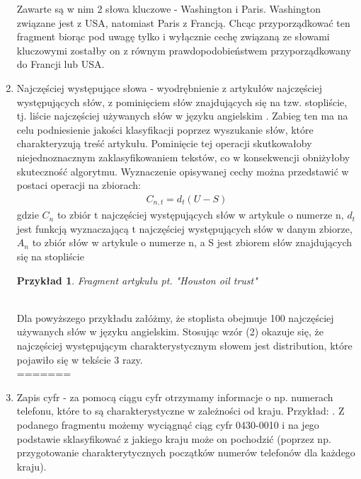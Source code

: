 \documentclass{classrep}
\newtheorem{exmp}{Przykład}[section]
\begin{document}
\begin{enumerate}
    Zawarte są w nim 2 słowa kluczowe - Washington i Paris. Washington związane jest z USA, natomiast Paris z Francją. Chcąc przyporządkować ten fragment biorąc pod uwagę tylko i wyłącznie cechę związaną ze słowami kluczowymi zostałby on z równym prawdopodobieństwem przyporządkowany do Francji lub USA. 
    \item Najczęściej występujące słowa - wyodrębnienie z artykułów najczęściej występujących słów, z pominięciem słów znajdujących się na tzw. stopliście, tj. liście najczęściej używanych słów w języku angielskim \cite{reuters}. Zabieg ten ma na celu podniesienie jakości klasyfikacji poprzez wyszukanie słów, które charakteryzują treść artykułu. Pominięcie tej operacji skutkowałoby niejednoznacznym zaklasyfikowaniem tekstów, co w konsekwencji obniżyłoby skuteczność algorytmu. 
	Wyznaczenie opisywanej cechy można przedstawić w postaci operacji na zbiorach:
	\begin{gather}
	C_{n, t}= d_{t}(U - S)
	\end{gather} 
	\indent gdzie $C_{n}$ to zbiór t najczęściej występujących słów w artykule o numerze n, 
	$d_{t}$ jest funkcją wyznaczającą t najczęściej występujących słów w danym zbiorze, $A_{n}$ to zbiór słów w artykule o numerze n, 
	a S jest zbiorem słów znajdujących się na stopliście \\
	\begin{exmp}
    Fragment artykułu pt. "Houston oil trust"  \cite{coca_words} \\
		 \\
    \end{exmp} 
    Dla powyższego przykładu załóżmy, że stoplista obejmuje 100 najczęściej używanych słów w języku angielskim. Stosując wzór (2) okazuje się, że najczęściej występującym charakterystycznym słowem jest distribution, które pojawiło się w tekście 3 razy. \\
=======
    \item Zapis cyfr - za pomocą ciągu cyfr otrzymamy informacje o np. numerach telefonu, które to są charakterystyczne w zależności od kraju. Przykład: .
Z podanego fragmentu możemy wyciągnąć ciąg cyfr 0430-0010 i na jego podstawie sklasyfikować z jakiego kraju może on pochodzić (poprzez np. przygotowanie charakterytycznych początków numerów telefonów dla każdego kraju).

\end{enumerate}
\end{document}
